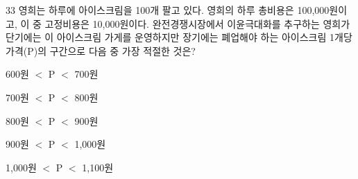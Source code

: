 \begin{question}{33}
영희는 하루에 아이스크림을 100개 팔고 있다. 영희의 하루 총비용은 100,000원이고, 이 중 고정비용은 10,000원이다. 완전경쟁시장에서 이윤극대화를 추구하는 영희가 단기에는 이 아이스크림 가게를 운영하지만 장기에는 폐업해야 하는 아이스크림 1개당 가격(P)의 구간으로 다음 중 가장 적절한 것은?
\begin{choices}
  \item 600원 $<$ P $<$ 700원
  \item 700원 $<$ P $<$ 800원
  \item 800원 $<$ P $<$ 900원
  \item 900원 $<$ P $<$ 1,000원
  \item 1,000원 $<$ P $<$ 1,100원
\end{choices}
\end{question}
